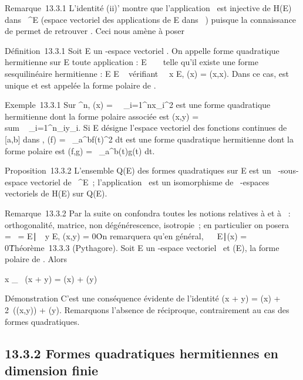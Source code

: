 \documentclass[]{article}
\begin{document}
Remarque~13.3.1 L'identité (ii)' montre que l'application
\phi\mapsto~\Phi est injective de H(E) dans ~^E
(espace vectoriel des applications de E dans ~) puisque la connaissance
de \Phi permet de retrouver \phi. Ceci nous amène à poser

Définition~13.3.1 Soit E un -espace vectoriel . On appelle forme
quadratique hermitienne sur E toute application \Phi : E \rightarrow~ ~ telle qu'il
existe une forme sesquilinéaire hermitienne \phi : E \times E \rightarrow~  vérifiant
\forall~~x \in E, \Phi(x) = \phi(x,x). Dans ce cas, \phi est
unique et est appelée la forme polaire de \Phi.

Exemple~13.3.1 Sur ^n, \Phi(x) =\
\sum ~
_i=1^nx_i^2 est
une forme quadratique hermitienne dont la forme polaire associée est
\phi(x,y) = \\sum ~
_i=1^n\overlinex_iy_i.
Si E désigne l'espace vectoriel des fonctions continues de [a,b]
dans \mathbb{C}, \Phi(f) =\int ~
_a^bf(t)^2 dt est une forme
quadratique hermitienne dont la forme polaire est \phi(f,g)
=\int ~
_a^b\overlinef(t)g(t) dt.

Proposition~13.3.2 L'ensemble Q(E) des formes quadratiques sur E est un
~-sous-espace vectoriel de ~^E~; l'application
\phi\mapsto~\Phi est un isomorphisme de \mathbb{R}~-espaces
vectoriels de H(E) sur Q(E).

Remarque~13.3.2 Par la suite on confondra toutes les notions relatives à
\phi et à \Phi~: orthogonalité, matrice, non dégénérescence, isotropie~; en
particulier on posera
\mathrmKer~\Phi
= \mathrmKer~\phi =
\x \in
E∣\forall~~y \in E, \phi(x,y) =
0\. On remarquera qu'en général,
\mathrmKer\Phi\mathrel\neq~~\x
\in E∣\Phi(x) = 0\.

Théorème~13.3.3 (Pythagore). Soit E un -espace vectoriel ~et \Phi \inQ(E), \phi
la forme polaire de \Phi. Alors

x \bot_\phiy \rigtharrow~ \Phi(x + y) = \Phi(x) + \Phi(y)

Démonstration C'est une conséquence évidente de l'identité \Phi(x + y) =
\Phi(x) + 2\mathrmRe~(\phi(x,y)) +
\Phi(y). Remarquons l'absence de réciproque, contrairement au cas des
formes quadratiques.

\subsection{13.3.2 Formes quadratiques hermitiennes en dimension finie}
\end{document}
